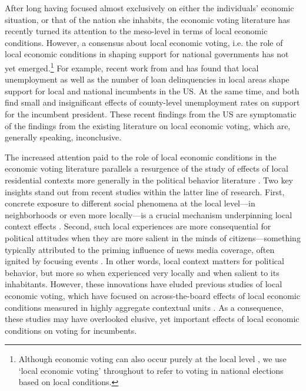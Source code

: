 \documentclass[12pt,a4paper]{article}
\begin{document}
	After long having focused almost exclusively on either the individuals’ economic situation, or that of the nation she inhabits, the economic voting literature has recently turned its attention to the meso-level in terms of local economic conditions. However, a consensus about local economic voting, i.e. the role of local economic conditions in shaping support for national governments has not yet emerged.\footnote{Although economic voting can also occur purely at the local level \cite[cf.][]{hopkins2017retrospective, burnett2017politics}, we use `local economic voting’ throughout to refer to voting in national elections based on local conditions.} For example, recent work from \cite{hansford2015reevaluating} and \cite{healy2017presidential} has found that local unemployment as well as the number of loan delinquencies in local areas shape support for local and national incumbents in the US. At the same time, \cite{hill2010economic} and \cite{wright2012unemployment} both find small and insignificant effects of county-level unemployment rates on support for the incumbent president. These recent findings from the US are symptomatic of the findings from the existing literature on local economic voting, which are, generally speaking, inconclusive.
	
	The increased attention paid to the role of local economic conditions in the economic voting literature parallels a resurgence of the study of effects of local residential contexts more generally in the political behavior literature \cite[e.g.,][]{hopkins2010politicized,enos2016demolition}. Two key insights stand out from recent studies within the latter line of research. First, concrete exposure to different social phenomena at the local level—in neighborhoods or even more locally—is a crucial mechanism underpinning local context effects \citep{moore2017defining,dinesen2015ethnic,enos2016demolition,hjorth2017influence}. Second, such local experiences are more consequential for political attitudes when they are more salient in the minds of citizens—something typically attributed to the priming influence of news media coverage, often ignited by focusing events \citep{hopkins2010politicized,legewie2013terrorist,davenport2015policy}. In other words, local context matters for political behavior, but more so when experienced very locally and when salient to its inhabitants. However, these innovations have eluded previous studies of local economic voting, which have focused on across-the-board effects of local economic conditions measured in highly aggregate contextual units \citep[though see][]{bisgaard2016reconsidering,healy2017presidential}. As a consequence, these studies may have overlooked elusive, yet important effects of local economic conditions on voting for incumbents. 
	
\end{document}
